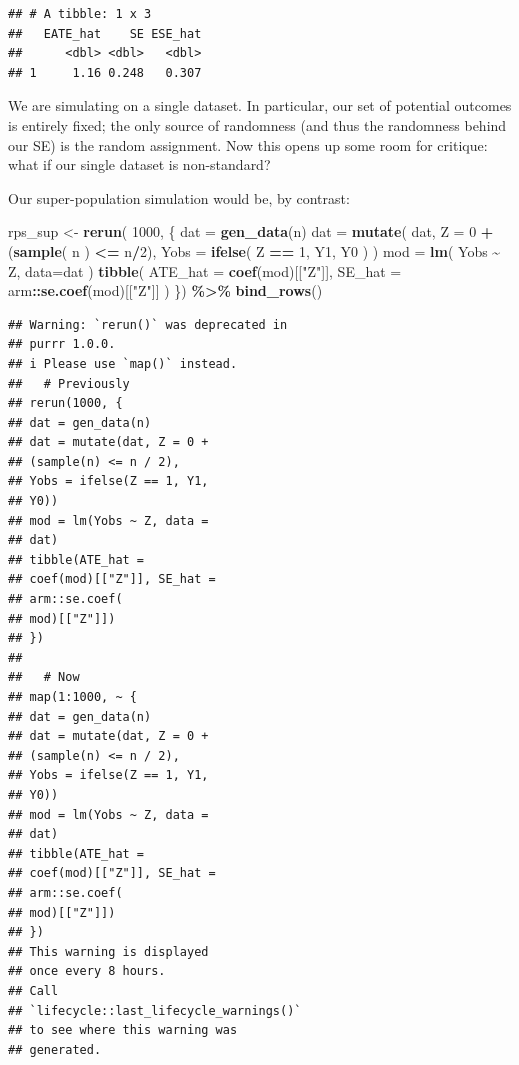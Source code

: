 \documentclass[
]{book}
\newenvironment{Shaded}{\begin{snugshade}}{\end{snugshade}}
\newcommand{\AttributeTok}[1]{\textcolor[rgb]{0.13,0.29,0.53}{#1}}
\newcommand{\DecValTok}[1]{\textcolor[rgb]{0.00,0.00,0.81}{#1}}
\newcommand{\FunctionTok}[1]{\textcolor[rgb]{0.13,0.29,0.53}{\textbf{#1}}}
\newcommand{\NormalTok}[1]{#1}
\newcommand{\OtherTok}[1]{\textcolor[rgb]{0.56,0.35,0.01}{#1}}
\newcommand{\SpecialCharTok}[1]{\textcolor[rgb]{0.81,0.36,0.00}{\textbf{#1}}}
\newcommand{\StringTok}[1]{\textcolor[rgb]{0.31,0.60,0.02}{#1}}
\begin{document}
\begin{verbatim}
## # A tibble: 1 x 3
##   EATE_hat    SE ESE_hat
##      <dbl> <dbl>   <dbl>
## 1     1.16 0.248   0.307
\end{verbatim}

We are simulating on a single dataset.
In particular, our set of potential outcomes is entirely fixed; the only source of randomness (and thus the randomness behind our SE) is the random assignment.
Now this opens up some room for critique: what if our single dataset is non-standard?

Our super-population simulation would be, by contrast:

\begin{Shaded}
\begin{Highlighting}[]
\NormalTok{rps\_sup }\OtherTok{\textless{}{-}} \FunctionTok{rerun}\NormalTok{( }\DecValTok{1000}\NormalTok{, \{}
\NormalTok{  dat }\OtherTok{=} \FunctionTok{gen\_data}\NormalTok{(n)}
\NormalTok{  dat }\OtherTok{=} \FunctionTok{mutate}\NormalTok{( dat,}
              \AttributeTok{Z =} \DecValTok{0} \SpecialCharTok{+}\NormalTok{ (}\FunctionTok{sample}\NormalTok{( n ) }\SpecialCharTok{\textless{}=}\NormalTok{ n}\SpecialCharTok{/}\DecValTok{2}\NormalTok{),}
              \AttributeTok{Yobs =} \FunctionTok{ifelse}\NormalTok{( Z }\SpecialCharTok{==} \DecValTok{1}\NormalTok{, Y1, Y0 ) )}
\NormalTok{  mod }\OtherTok{=} \FunctionTok{lm}\NormalTok{( Yobs }\SpecialCharTok{\textasciitilde{}}\NormalTok{ Z, }\AttributeTok{data=}\NormalTok{dat )}
  \FunctionTok{tibble}\NormalTok{( }\AttributeTok{ATE\_hat =} \FunctionTok{coef}\NormalTok{(mod)[[}\StringTok{"Z"}\NormalTok{]],}
          \AttributeTok{SE\_hat =}\NormalTok{ arm}\SpecialCharTok{::}\FunctionTok{se.coef}\NormalTok{(mod)[[}\StringTok{"Z"}\NormalTok{]] )}
\NormalTok{  \}) }\SpecialCharTok{\%\textgreater{}\%}
  \FunctionTok{bind\_rows}\NormalTok{()}
\end{Highlighting}
\end{Shaded}

\begin{verbatim}
## Warning: `rerun()` was deprecated in
## purrr 1.0.0.
## i Please use `map()` instead.
##   # Previously
## rerun(1000, {
## dat = gen_data(n)
## dat = mutate(dat, Z = 0 +
## (sample(n) <= n / 2),
## Yobs = ifelse(Z == 1, Y1,
## Y0))
## mod = lm(Yobs ~ Z, data =
## dat)
## tibble(ATE_hat =
## coef(mod)[["Z"]], SE_hat =
## arm::se.coef(
## mod)[["Z"]])
## })
## 
##   # Now
## map(1:1000, ~ {
## dat = gen_data(n)
## dat = mutate(dat, Z = 0 +
## (sample(n) <= n / 2),
## Yobs = ifelse(Z == 1, Y1,
## Y0))
## mod = lm(Yobs ~ Z, data =
## dat)
## tibble(ATE_hat =
## coef(mod)[["Z"]], SE_hat =
## arm::se.coef(
## mod)[["Z"]])
## })
## This warning is displayed
## once every 8 hours.
## Call
## `lifecycle::last_lifecycle_warnings()`
## to see where this warning was
## generated.
\end{verbatim}
\end{document}
